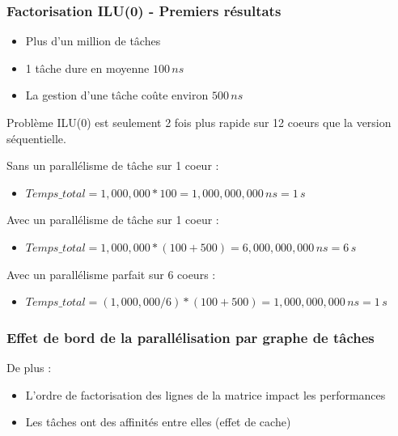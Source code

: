 \documentclass{beamer}
\begin{document}
\begin{frame}
  \frametitle{Factorisation ILU(0) - Premiers résultats}

  \begin{itemize}
        \item Plus d'un million de tâches
        \item 1 tâche dure en moyenne $100\,ns$
        \item La gestion d'une tâche coûte environ $500\,ns$
  \end{itemize}

  \begin{alertblock}{Problème}
    ILU(0) est seulement 2 fois plus rapide sur 12 coeurs que la version séquentielle.
  \end{alertblock}

  \pause

  Sans un parallélisme de tâche sur 1 coeur :
  \begin{itemize}
     \item $Temps\_total = 1,000,000 * 100 = 1,000,000,000\,ns = 1\,s$
  \end{itemize}

  \pause

  Avec un parallélisme de tâche sur 1 coeur :
  \begin{itemize}
     \item $Temps\_total = 1,000,000 * (100 + 500) = 6,000,000,000\,ns = 6\,s$
  \end{itemize}

  \pause

  Avec un parallélisme parfait sur 6 coeurs :
  \begin{itemize}
     \item $Temps\_total = (1,000,000 / 6) * (100 + 500) = 1,000,000,000\,ns = 1\,s$
  \end{itemize}
\end{frame}

\begin{frame}
  \frametitle{Effet de bord de la parallélisation par graphe de tâches}

  De plus :
  \begin{itemize}
    \item L'ordre de factorisation des lignes de la matrice impact les performances
    \item Les tâches ont des affinités entre elles (effet de cache)
  \end{itemize}

\end{frame}
\end{document}
